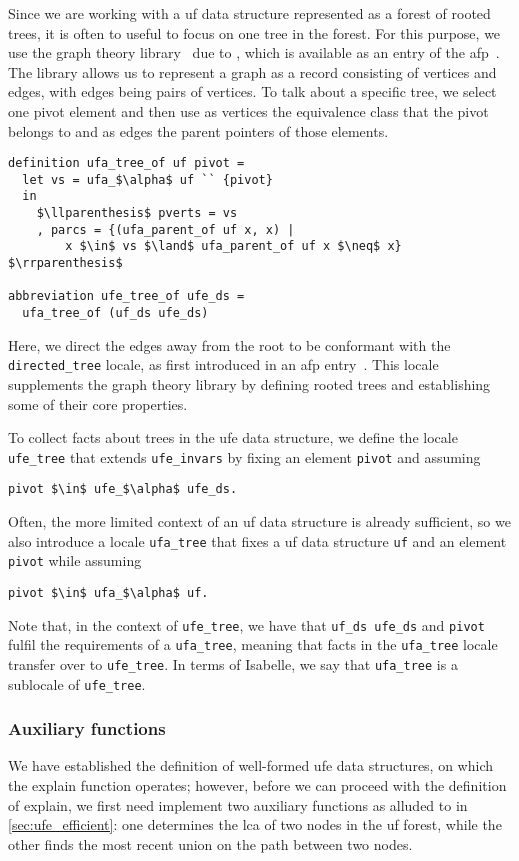 \documentclass[
  sigplan,
  10pt,
  anonymous,
  review,
  ]{acmart}
\begin{document}
Since we are working with a \acrshort{uf} data structure represented as a forest of rooted trees, it is often to useful to focus on one tree in the forest.
For this purpose, we use the graph theory library~\cite{graph_theory} due to \citeauthor{graph_theory}, which is available as an entry of the \acrshort{afp}~\cite{graph_theory_afp}.
The library allows us to represent a graph as a record consisting of vertices and edges, with edges being pairs of vertices. 
To talk about a specific tree, we select one pivot element and then use as vertices the equivalence class that the pivot belongs to and as edges the parent pointers of those elements.
\begin{lstlisting}
definition ufa_tree_of uf pivot =
  let vs = ufa_$\alpha$ uf `` {pivot} 
  in
    $\llparenthesis$ pverts = vs
    , parcs = {(ufa_parent_of uf x, x) |
        x $\in$ vs $\land$ ufa_parent_of uf x $\neq$ x} $\rrparenthesis$  

abbreviation ufe_tree_of ufe_ds =
  ufa_tree_of (uf_ds ufe_ds)
\end{lstlisting}
Here, we direct the edges away from the root to be conformant with the \lstinline|directed_tree| locale, as first introduced in an \acrshort{afp} entry~\cite{query_optimization_afp}.
This locale supplements the graph theory library by defining rooted trees and establishing some of their core properties.

To collect facts about trees in the \acrshort{ufe} data structure, we define the locale \lstinline|ufe_tree| that extends \lstinline|ufe_invars| by fixing an element \lstinline|pivot| and assuming 
\begin{lstlisting}
pivot $\in$ ufe_$\alpha$ ufe_ds.
\end{lstlisting}
Often, the more limited context of an \acrshort{uf} data structure is already sufficient, so we also introduce a locale \lstinline|ufa_tree| that fixes a \acrshort{uf} data structure \lstinline|uf| and an element \lstinline|pivot| while assuming
\begin{lstlisting}
pivot $\in$ ufa_$\alpha$ uf.
\end{lstlisting}
Note that, in the context of \lstinline|ufe_tree|, we have that \lstinline|uf_ds ufe_ds| and \lstinline|pivot| fulfil the requirements of a \lstinline|ufa_tree|, meaning that facts in the \lstinline|ufa_tree| locale transfer over to \lstinline|ufe_tree|.
In terms of Isabelle, we say that \lstinline|ufa_tree| is a sublocale of \lstinline|ufe_tree|.

\subsubsection{Auxiliary functions}
We have established the definition of well-formed \acrshort{ufe} data structures, on which the explain function operates;
however, before we can proceed with the definition of explain, we first need implement two auxiliary functions as alluded to in \autoref{sec:ufe_efficient}:
one determines the \acrshort{lca} of two nodes in the \acrshort{uf} forest, while 
the other finds the most recent union on the path between two nodes.
\end{document}
